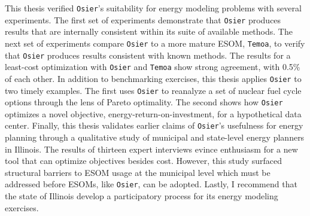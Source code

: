 This thesis verified \texttt{Osier}'s suitability for energy modeling problems
with several experiments. The first set of experiments demonstrate that
\texttt{Osier} produces results that are internally consistent within its suite
of available methods. The next set of experiments compare \texttt{Osier} to a
more mature ESOM, \texttt{Temoa}, to verify that \texttt{Osier} produces results
consistent with known methods. The results for a least-cost optimization with
\texttt{Osier} and \texttt{Temoa} show strong agreement, with 0.5\% of each
other. In addition to benchmarking exercises, this thesis applies \texttt{Osier}
to two timely examples. The first uses \texttt{Osier} to reanalyze a set of
nuclear fuel cycle options through the lens of Pareto optimality. The second
shows how \texttt{Osier} optimizes a novel objective,
energy-return-on-investment, for a hypothetical data center. Finally, this
thesis validates earlier claims of \texttt{Osier}'s usefulness for energy
planning through a qualitative study of municipal and state-level energy
planners in Illinois. The results of thirteen expert interviews evince
enthusiasm for a new tool that can optimize objectives besides cost. However,
this study surfaced structural barriers to ESOM usage at the municipal level
which must be addressed before ESOMs, like \texttt{Osier}, can be adopted.
Lastly, I recommend that the state of Illinois develop a participatory process
for its energy modeling exercises.